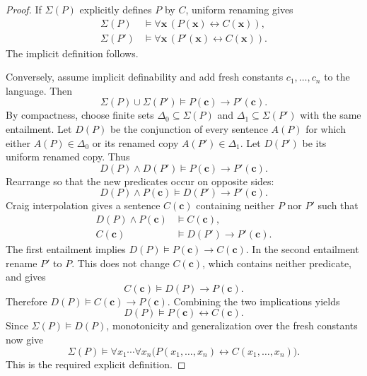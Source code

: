 \begin{proof}
If $\Sigma(P)$ explicitly defines $P$ by $C$, uniform renaming gives
\[
\begin{aligned}
 \Sigma(P)&\models\forall\mathbf x\,(P(\mathbf x)\leftrightarrow C(\mathbf x)),\\
 \Sigma(P')&\models\forall\mathbf x\,(P'(\mathbf x)\leftrightarrow C(\mathbf x)).
\end{aligned}
\]
The implicit definition follows.

Conversely, assume implicit definability and add fresh constants
$c_1,\ldots,c_n$ to the language. Then
\[
 \Sigma(P)\cup\Sigma(P')\models P(\mathbf c)\to P'(\mathbf c).
\]
By compactness, choose finite sets $\Delta_0\subseteq\Sigma(P)$ and
$\Delta_1\subseteq\Sigma(P')$ with the same entailment. Let $D(P)$ be the
conjunction of every sentence $A(P)$ for which either $A(P)\in\Delta_0$
or its renamed copy $A(P')\in\Delta_1$. Let $D(P')$ be its uniform renamed
copy. Thus
\[
 D(P)\land D(P')\models P(\mathbf c)\to P'(\mathbf c).
\]
Rearrange so that the new predicates occur on opposite sides:
\[
 D(P)\land P(\mathbf c)\models D(P')\to P'(\mathbf c).
\]
Craig interpolation gives a sentence $C(\mathbf c)$ containing neither
$P$ nor $P'$ such that
\[
\begin{aligned}
 D(P)\land P(\mathbf c)&\models C(\mathbf c),\\
 C(\mathbf c)&\models D(P')\to P'(\mathbf c).
\end{aligned}
\]
The first entailment implies
$D(P)\models P(\mathbf c)\to C(\mathbf c)$.
In the second entailment rename $P'$ to $P$. This does not change
$C(\mathbf c)$, which contains neither predicate, and gives
\[
 C(\mathbf c)\models D(P)\to P(\mathbf c).
\]
Therefore $D(P)\models C(\mathbf c)\to P(\mathbf c)$. Combining the two
implications yields
\[
 D(P)\models P(\mathbf c)\leftrightarrow C(\mathbf c).
\]
Since $\Sigma(P)\models D(P)$, monotonicity and generalization over the
fresh constants now give
\[
 \Sigma(P)\models\forall x_1\cdots\forall x_n
        \bigl(P(x_1,\ldots,x_n)\leftrightarrow C(x_1,\ldots,x_n)\bigr).
\]
This is the required explicit definition.
\end{proof}
